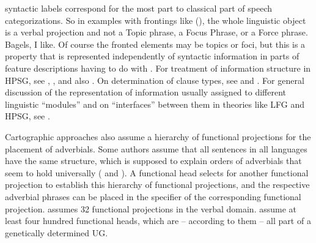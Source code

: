\documentclass[output=paper,biblatex,babelshorthands,newtxmath,draftmode,colorlinks,citecolor=brown]{langscibook}
\begin{document}
syntactic labels correspond for the most part to classical part of speech categorizations. So in examples with
frontings like (), the whole linguistic object is a verbal projection and not a Topic phrase, a Focus
Phrase, or a Force phrase.
\ea
Bagels, I like.
\z
Of course the fronted elements may be topics or foci, but this is a property that is represented
independently of syntactic information in parts of feature descriptions having to do with
. For treatment of information structure in HPSG, see
, ,  and also
. On determination of clause types, see 
and . For general discussion of the representation of
information usually assigned to different linguistic ``modules'' and on ``interfaces''
between them in theories like LFG and HPSG, see .

\largerpage
Cartographic approaches also assume a hierarchy of functional projections for the placement of
adverbials. Some authors assume that all sentences in all languages have the same structure, which is supposed
to explain orders of adverbials that seem to hold universally (\eg \citealp[]{Cinque99a-u}
and \citealp[--55]{CR2010a}). A functional head selects for another functional
projection to establish this hierarchy of functional projections, and the respective adverbial
phrases can be placed in the specifier of the corresponding functional projection. \citet[]{Cinque99a-u} assumes 32 functional projections in the verbal domain. \citet[, 65]{CR2010a} assume at least four hundred functional heads, which are -- according to them -- all
part of a genetically determined UG.
\end{document}
